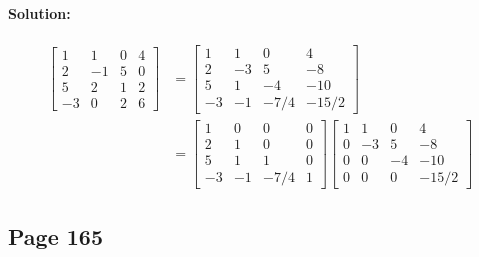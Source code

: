 \documentclass{article}  %
\begin{document}
        \paragraph{Solution:}
        \begin{align*}
            \left[                 %
              \begin{array}{rrrr}   %
                1 & 1 & 0 & 4 \\
                2 & -1 & 5 & 0 \\
                5 & 2 & 1 & 2 \\
                -3 & 0 & 2 & 6 
              \end{array}
            \right]  &\bm=               %
            \left[                 %
              \begin{array}{rrrr}   %
                1 & 1 & 0 & 4 \\
                2 & -3 & 5 & -8 \\
                5 & 1 & -4 & -10 \\
                -3 & -1 & -7/4 & -15/2
              \end{array}
            \right] \\ &\bm=
            \left[                 %
              \begin{array}{rrrr}   %
                1 & 0 & 0 & 0 \\
                2 & 1 & 0 & 0 \\
                5 & 1 & 1 & 0 \\
                -3 & -1 & -7/4 & 1
              \end{array}
            \right]
            \left[                 %
              \begin{array}{rrrr}   %
                1 & 1 & 0 & 4 \\
                0 & -3 & 5 & -8 \\
                0 & 0 & -4 & -10 \\
                0 & 0 & 0 & -15/2
              \end{array}
            \right]
        \end{align*}
        \subsection*{Page 165}
\end{document}
